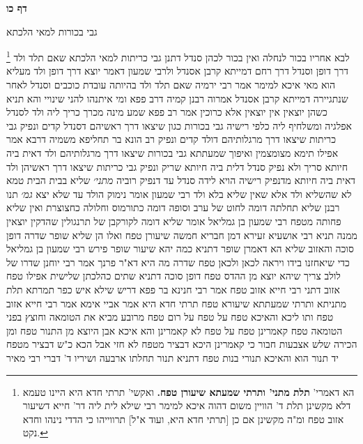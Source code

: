 \documentclass[12pt, openany]{book}
\newcommand{\sethebfont}{
\fontsize{10.5pt}{21.0pt} \selectfont
}
\newcommand{\twocol}[1]{
	{\sethebfont \begin{multicols}{2}
			#1
	\end{multicols}}	
}
\newcommand{\sectname}{}
\newcommand{\newsection}[1]{
	\addcontentsline{toc}{section}{#1}
	\renewcommand{\sectname}{#1}	
	\vspace{-\baselineskip}
	\begin{center}
		\textbf{%
\fontsize{16pt}{16pt}\selectfont
			#1}
	\end{center}
	\vspace{-\baselineskip}
	\nopagebreak
}
\newcommand{\footnotecomment}[1]{
	\renewcommand\thefootnote{}
	\footnote{#1}}
\newcommand{\commenta}[1]{\footnotecomment{#1}}
\begin{document}
\newsection{דף כו}
\twocol{גבי בכורות למאי הלכתא 
\commenta{ הא דאמרי' \textbf{תלת מתני' ותרתי שמעתא שיעורן טפח.} ואקשי' תרתי חדא היא היינו טעמא דלא מקשינן תלת ד' הוויין משום דהוה איכא למימר רבי שילא לית ליה דר' חייא דשיעור אזוב טפח ומ"ה מקשינן אם כן [תרתי חדא היא, ועוד א"ל] תרווייהו כי הדדי נינהו וחדא נקט. }
לבא אחריו בכור לנחלה ואין בכור לכהן 
סנדל דתנן גבי כריתות למאי הלכתא 
שאם תלד ולד דרך דופן וסנדל דרך רחם דמייתא קרבן אסנדל 
ולרבי שמעון דאמר יוצא דרך דופן ולד מעליא הוא מאי איכא למימר 
אמר רבי ירמיה שאם תלד ולד בהיותה עובדת כוכבים וסנדל לאחר שנתגיירה דמייתא קרבן אסנדל 
אמרוה רבנן קמיה דרב פפא ומי איתנהו להני שינויי והא תניא כשהן יוצאין אין יוצאין אלא כרוכין 
אמר רב פפא שמע מינה מכרך כריך ליה ולד לסנדל אפלגיה ומשלחיף ליה כלפי רישיה גבי בכורות כגון שיצאו דרך ראשיהם דסנדל קדים ונפיק גבי כריתות שיצאו דרך מרגלותיהם דולד קדים ונפיק 
רב הונא בר תחליפא משמיה דרבא אמר אפילו תימא מצומצמין ואיפוך שמעתתא גבי בכורות שיצאו דרך מרגלותיהם ולד דאית ביה חיותא סריך ולא נפיק סנדל דלית ביה חיותא שריק ונפיק גבי כריתות שיצאו דרך ראשיהן ולד דאית ביה חיותא מדנפיק רישיה הויא לידה סנדל עד דנפיק רוביה
{\large\emph{מתני׳}} שליא בבית הבית טמא לא שהשליא ולד אלא שאין שליא בלא ולד 
רבי שמעון אומר נימוק הולד עד שלא יצא
{\large\emph{גמ׳}} תנו רבנן שליא תחלתה דומה לחוט של ערב וסופה דומה כתורמוס וחלולה כחצוצרת ואין שליא פחותה מטפח רבי שמעון בן גמליאל אומר שליא דומה לקורקבן של תרנגולין שהדקין יוצאין ממנה 
תניא רבי אושעיא זעירא דמן חבריא חמשה שיעורן טפח ואלו הן שליא שופר שדרה דופן סוכה והאזוב 
שליא הא דאמרן שופר דתניא כמה יהא שיעור שופר פירש רבי שמעון בן גמליאל כדי שיאחזנו בידו ויראה לכאן ולכאן טפח 
שדרה מה היא דא"ר פרנך אמר רבי יוחנן שדרו של לולב צריך שיהא יוצא מן ההדס טפח דופן סוכה דתניא שתים כהלכתן שלישית אפילו טפח אזוב דתני רבי חייא אזוב טפח 
אמר רבי חנינא בר פפא דריש שילא איש כפר תמרתא תלת מתניתא ותרתי שמעתתא שיעורא טפח תרתי חדא היא אמר אביי אימא אמר רבי חייא אזוב טפח 
ותו ליכא והאיכא טפח על טפח על רום טפח מרובע מביא את הטומאה וחוצץ בפני הטומאה 
טפח קאמרינן טפח על טפח לא קאמרינן 
והא איכא אבן היוצא מן התנור טפח ומן הכירה שלש אצבעות חבור 
כי קאמרינן היכא דבציר מטפח לא חזי אבל הכא כ"ש דבציר מטפח יד תנור הוא 
והאיכא
תנורי בנות טפח דתניא תנור תחלתו ארבעה ושיריו ד' דברי רבי מאיר 
}
\end{document}
